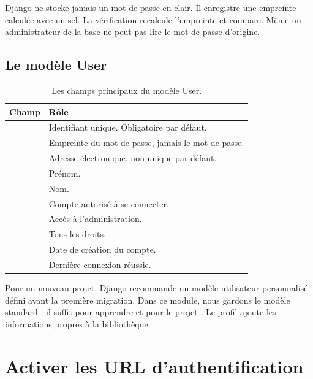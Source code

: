\begin{retenir}
Django ne stocke jamais un mot de passe en clair. Il enregistre une empreinte
calculée avec un sel. La vérification recalcule l'empreinte et compare. Même un
administrateur de la base ne peut pas lire le mot de passe d'origine.
\end{retenir}

\subsection{Le modèle User}

\begin{table}[htbp]
\centering
\small
\begin{tabularx}{\textwidth}{L{4.4cm} X}
\toprule
\textbf{Champ} & \textbf{Rôle} \\
\midrule
{} & Identifiant unique. Obligatoire par défaut. \\
 & Empreinte du mot de passe, jamais le mot de passe. \\
 & Adresse électronique, non unique par défaut. \\
 & Prénom. \\
 & Nom. \\
 & Compte autorisé à se connecter. \\
 & Accès à l'administration. \\
 & Tous les droits. \\
 & Date de création du compte. \\
 & Dernière connexion réussie. \\
\bottomrule
\end{tabularx}
\caption{Les champs principaux du modèle User.}
\end{table}

\begin{note}
Pour un nouveau projet, Django recommande un modèle utilisateur personnalisé défini
avant la première migration. Dans ce module, nous gardons le modèle standard : il
suffit pour apprendre et pour le projet \gesibiblio. Le profil  ajoute
les informations propres à la bibliothèque.
\end{note}

\section{Activer les URL d'authentification}

